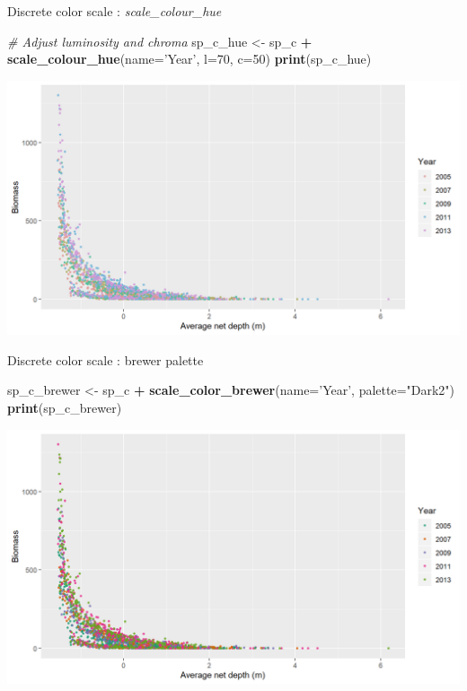 \documentclass[
  ignorenonframetext,
]{beamer}
\newenvironment{Shaded}{\begin{snugshade}}{\end{snugshade}}
\newcommand{\CommentTok}[1]{\textcolor[rgb]{0.56,0.35,0.01}{\textit{#1}}}
\newcommand{\DataTypeTok}[1]{\textcolor[rgb]{0.13,0.29,0.53}{#1}}
\newcommand{\DecValTok}[1]{\textcolor[rgb]{0.00,0.00,0.81}{#1}}
\newcommand{\KeywordTok}[1]{\textcolor[rgb]{0.13,0.29,0.53}{\textbf{#1}}}
\newcommand{\NormalTok}[1]{#1}
\newcommand{\OperatorTok}[1]{\textcolor[rgb]{0.81,0.36,0.00}{\textbf{#1}}}
\newcommand{\StringTok}[1]{\textcolor[rgb]{0.31,0.60,0.02}{#1}}
\begin{document}
\begin{frame}[fragile]{Discrete color scale : \emph{scale\_colour\_hue}}
\protect\hypertarget{discrete-color-scale-scale_colour_hue-1}{}

\begin{Shaded}
\begin{Highlighting}[]
\CommentTok{# Adjust luminosity and chroma}
\NormalTok{sp_c_hue <-}\StringTok{ }\NormalTok{sp_c }\OperatorTok{+}
\StringTok{  }\KeywordTok{scale_colour_hue}\NormalTok{(}\DataTypeTok{name=}\StringTok{'Year'}\NormalTok{, }\DataTypeTok{l=}\DecValTok{70}\NormalTok{, }\DataTypeTok{c=}\DecValTok{50}\NormalTok{)}
\KeywordTok{print}\NormalTok{(sp_c_hue)}
\end{Highlighting}
\end{Shaded}

\begin{center}\includegraphics[width=0.8\linewidth]{figure/sp_discrete_color_hue2b-1} \end{center}

\end{frame}

\begin{frame}[fragile]{Discrete color scale : brewer palette}
\protect\hypertarget{discrete-color-scale-brewer-palette}{}

\begin{Shaded}
\begin{Highlighting}[]
\NormalTok{sp_c_brewer <-}\StringTok{ }\NormalTok{sp_c }\OperatorTok{+}
\StringTok{  }\KeywordTok{scale_color_brewer}\NormalTok{(}\DataTypeTok{name=}\StringTok{'Year'}\NormalTok{, }\DataTypeTok{palette=}\StringTok{"Dark2"}\NormalTok{)}
\KeywordTok{print}\NormalTok{(sp_c_brewer)}
\end{Highlighting}
\end{Shaded}

\begin{center}\includegraphics[width=0.8\linewidth]{figure/sp_discrete_color4-1} \end{center}

\end{frame}
\end{document}
